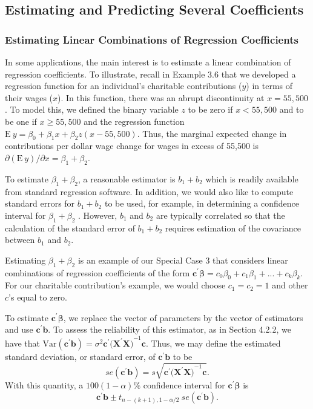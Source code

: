 \subsection{Estimating and Predicting Several Coefficients}

\subsubsection*{Estimating Linear Combinations of Regression Coefficients}

In some applications, the main interest is to estimate a linear
combination of regression coefficients. To illustrate, recall in
Example 3.6 that we developed a regression function for an
individual's charitable contributions ($y$) in terms of their wages
($x$). In this function, there was an abrupt discontinuity at
$x=55,500$. To model this, we defined the binary variable $z$ to be
zero if  $x<55,500$ and to be one if $x\geq 55,500$ and the
regression function $\mathrm{E~}y=\beta_0+\beta_1x+\beta
_2z(x-55,500)$. Thus, the marginal expected change in contributions
per dollar wage change for wages in excess of 55,500 is $\partial
\left( \mathrm{E~}y\right) /\partial x=\beta_1+\beta _2$.

To estimate $\beta_1+\beta_2$, a reasonable estimator is $b_1+b_2$
which is readily available from standard regression software. In
addition, we would also like to compute standard errors for
$b_1+b_2$ to be used,
for example, in determining a confidence interval for $\beta_1+\beta_2$%
. However, $b_1$ and $b_2$ are typically correlated so that the
calculation of the standard error of $b_1+b_2$ requires estimation
of the covariance between $b_1$ and $b_2$.

Estimating $\beta_1 + \beta_2$ is an example of our Special Case 3
that considers linear combinations of regression coefficients of the
form $\mathbf{c}^{\prime }  \boldsymbol \beta=c_0\beta
_0+c_1\beta_1+...+c_k\beta_k$. For our charitable contribution's
example, we would choose $c_1=c_2=1$ and other $c$'s equal to zero.

To estimate $\mathbf{c}^{\prime } \boldsymbol \beta $, we replace
the vector of
parameters by the vector of estimators and use $\mathbf{c}^{\prime }\mathbf{b%
}$. To assess the reliability of this estimator, as in Section
4.2.2, we have that $\mathrm{Var}\left( \mathbf{c}^{\prime
}\mathbf{b}\right) =\sigma ^{2} \mathbf{c}^{\prime
}(\mathbf{X^{\prime }X)}^{-1}\mathbf{c}$. Thus, we may define the
estimated standard deviation, or standard error, of $\mathbf{c}
^{\prime }\mathbf{b}$ to be
\begin{equation*}
se\left( \mathbf{c}^{\prime }\mathbf{b}\right) =s\sqrt{\mathbf{c}^{\prime }(%
\mathbf{X^{\prime }X)}^{-1}\mathbf{c}}.
\end{equation*}%
With this quantity, a $100(1-\alpha ) \%$ confidence interval for
$\mathbf{c}^{\prime } \boldsymbol \beta$ is
\begin{equation}  \label{E4:ConfIntLinCombination}
\mathbf{c}^{\prime }\mathbf{b}\pm t_{n-(k+1),1-\alpha /2} ~se(\mathbf{c}%
^{\prime }\mathbf{b}).
\end{equation}

